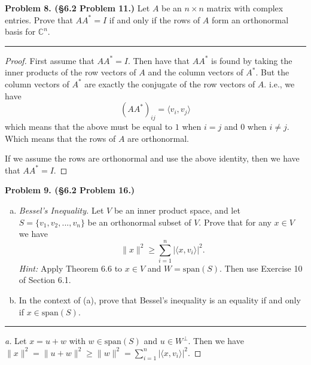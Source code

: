 \documentclass[leqno]{article}
\theoremstyle{nonumberplain}
\newtheorem{proof}{Proof}
\begin{document}
\noindent\textbf{Problem 8. (\S 6.2 Problem 11.)} Let $A$ be an $n\times n$ matrix with complex entries. Prove that $AA^*=I$ if and only if the rows of $A$ form an orthonormal basis for $\mathbb{C}^n$.



\noindent\rule[0.5ex]{\linewidth}{1pt}

\begin{proof}
First assume that $AA^*=I$. Then have that $AA^*$ is found by taking the inner products of the row vectors of $A$ and the column vectors of $A^*$.  But the column vectors of $A^*$ are exactly the conjugate of the row vectors of $A$.  i.e., we have 
\[
(AA^*)_{ij}=\langle v_i, v_j \rangle
\]
which means that the above must be equal to $1$ when $i=j$ and $0$ when $i\neq j$.  Which means that the rows of $A$ are orthonormal.

If we assume the rows are orthonormal and use the above identity, then we have that $AA^* = I$.
\end{proof}

\pagebreak



\noindent\textbf{Problem 9. (\S 6.2 Problem 16.)} 
\begin{enumerate}[(a)]
\item \emph{Bessel's Inequality.} Let $V$ be an inner product space, and let $S=\{v_1,v_2,...,v_n\}$ be an orthonormal subset of $V$. Prove that for any $x\in V$ we have 
\[
\|x\|^2 \geq \sum_{i=1}^n |\langle x,v_i\rangle |^2.
\]
\emph{Hint:} Apply Theorem 6.6 to $x\in V$ and $W=\mathrm{span}(S)$. Then use Exercise 10 of Section 6.1.

\item In the context of (a), prove that Bessel's inequality is an equality if and only if $x\in \mathrm{span}(S)$.
\end{enumerate}

\noindent\rule[0.5ex]{\linewidth}{1pt}

\begin{proof}[a]
Let $x=u+w$ with $w\in \mathrm{span}(S)$ and $u \in W^\perp$. Then we have
$\|x\|^2 = \|u+w\|^2 \geq \|w\|^2 = \sum_{i=1}^n |\langle x,v_i \rangle |^2$.  
\end{proof}
\end{document}

